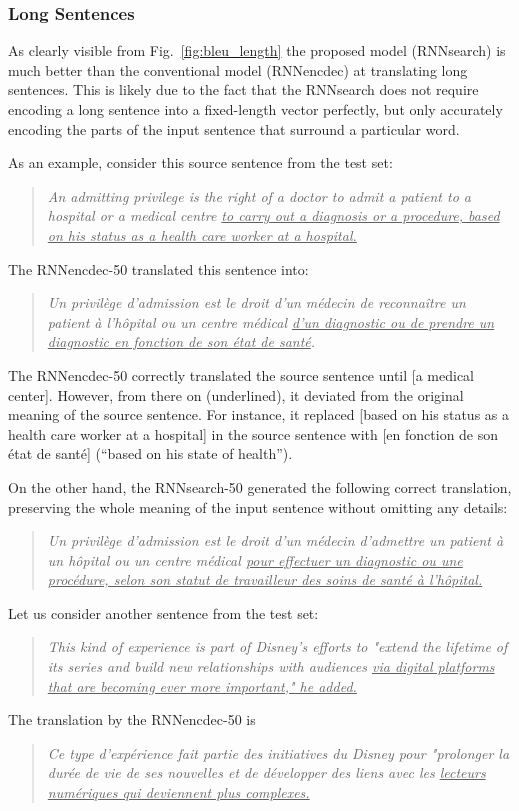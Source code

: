 \subsubsection{Long Sentences}

As clearly visible from Fig.~\ref{fig:bleu_length} the proposed model
(RNNsearch) is much better than the conventional model (RNNencdec) at translating
long sentences. This is likely due to the fact that the RNNsearch does not
require encoding a long sentence into a fixed-length vector perfectly, but only
accurately encoding the parts of the input sentence that surround a particular
word.

As an example, consider this source sentence from the test set:
\begin{quote}
    \it
An admitting privilege is the right of a doctor to admit a patient to a hospital
or a medical centre \uline{to carry out a diagnosis or a procedure, based on
his status as a health care worker at a hospital.}
\end{quote}
The RNNencdec-50 translated this sentence into:
\begin{quote}
    \it
Un privilège d'admission est le droit d'un m\'edecin de reconnaître un patient à
l'h\^opital ou un centre m\'edical \uline{d'un diagnostic ou de prendre un diagnostic
en fonction de son \'etat de sant\'e}.
\end{quote}

The RNNencdec-50 correctly translated the source sentence until [a medical center].
However, from there on (underlined), it deviated from the original meaning of
the source sentence. For instance, it replaced [based on his status as a health
care worker at a hospital] in the source sentence with [en fonction de son
\'etat de sant\'e] (``based on his state of health'').

On the other hand, the RNNsearch-50 generated the following correct translation,
preserving the whole meaning of the input sentence without omitting any details:
\begin{quote}
{    \it
Un privilège d'admission est le droit d'un m\'edecin d'admettre un patient à un
h\^opital ou un centre m\'edical \uline{pour effectuer un diagnostic ou une
proc\'edure, selon son statut de travailleur des soins de sant\'e à
l'h\^opital.}}
\end{quote}

Let us consider another sentence from the test set:
\begin{quote}
{    \it
This kind of experience is part of Disney's efforts to "extend the lifetime of
its series and build new relationships with audiences \uline{via digital platforms that
are becoming ever more important," he added.} }
\end{quote}
The translation by the RNNencdec-50 is
\begin{quote}
{    \it
Ce type d'exp\'erience fait partie des initiatives du Disney pour "prolonger la
dur\'ee de vie de ses nouvelles et de d\'evelopper des liens avec les
\uline{lecteurs num\'eriques qui deviennent plus complexes.} }
\end{quote}

